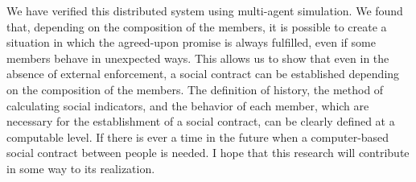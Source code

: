   We have verified this distributed system using multi-agent simulation. 
  We found that, depending on the composition of the members, 
  it is possible to create a situation in which the agreed-upon promise is always fulfilled, 
  even if some members behave in unexpected ways.
  This allows us to show that even in the absence of external enforcement, 
  a social contract can be established depending on the composition of the members.
  The definition of history, the method of calculating social indicators, and the behavior of each member, 
  which are necessary for the establishment of a social contract, can be clearly defined at a computable level.
  If there is ever a time in the future when a computer-based social contract between people is needed. 
I hope that this research will contribute in some way to its realization.
~ \\

